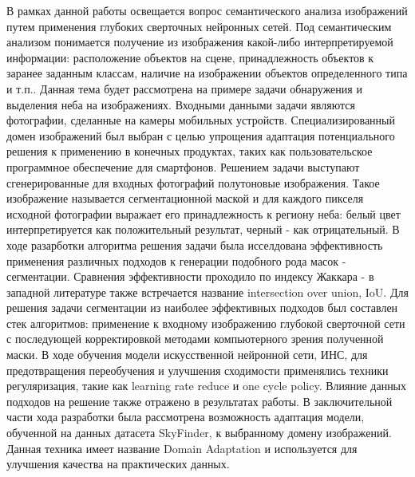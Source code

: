 \usepackage{amsmath}







\Intro

В рамках данной работы освещается вопрос семантического анализа изображений путем применения глубоких сверточных нейронных сетей.
Под семантическим анализом понимается получение из изображения какой-либо интерпретируемой информации: расположение объектов на сцене,
принадлежность объектов к заранее заданным классам, наличие на изображении объектов определенного типа и т.п..
Данная тема будет рассмотрена на примере задачи обнаружения и выделения неба на изображениях.
Входными данными задачи являются фотографии, сделанные на камеры мобильных устройств.
Специализированный домен изображений был выбран с целью упрощения адаптация потенциального решения к применению в конечных продуктах,
таких как пользовательское программное обеспечение для смартфонов.
Решением задачи выступают сгенерированные для входных фотографий полутоновые изображения.
Такое изображение называется сегментационной маской и для каждого пикселя исходной фотографии выражает его принадлежность
к региону неба: белый цвет интерпретируется как положительный результат, черный - как отрицательный.
В ходе разарботки алгоритма решения задачи была исселдована эффективность применения различных подходов к генерации подобного рода масок - сегментации.
Сравнения эффективности проходило по индексу Жаккара - в западной литературе также встречается название intersection over union, IoU.
Для решения задачи сегментации из наиболее эффективных подходов был составлен стек алгоритмов: применение к входному изображению глубокой сверточной сети
с последующей корректировкой методами компьютерного зрения полученной маски.
В ходе обучения модели искусственной нейронной сети, ИНС, для предотвращения переобучения и улучшения сходимости
применялись техники регуляризация, такие как learning rate reduce и one cycle policy.
Влияние данных подходов на решение также отражено в результатах работы.
В заключительной части хода разработки была рассмотрена возможность адаптация модели, обученной на данных датасета SkyFinder,
к выбранному домену изображений.
Данная техника имеет название Domain Adaptation и используется для улучшения качества на практических данных.

